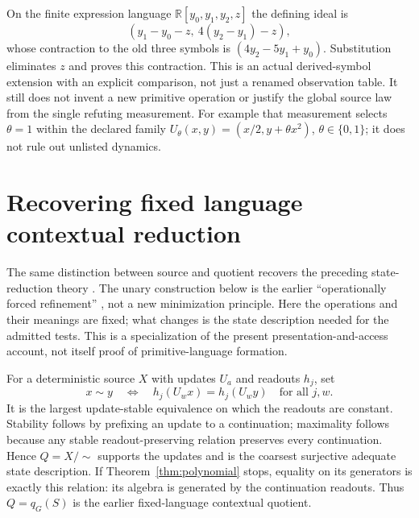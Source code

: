 \documentclass[11pt]{article}
\theoremstyle{definition}
\theoremstyle{remark}\newtheorem{remark}[theorem]{Remark}
\newcommand{\R}{\mathbb R}
\begin{document}
On the finite expression language $\R[y_0,y_1,y_2,z]$ the defining ideal is
\[
 (y_1-y_0-z,\ 4(y_2-y_1)-z),
\]
whose contraction to the old three symbols is
$(4y_2-5y_1+y_0)$. Substitution eliminates $z$ and proves this contraction.
This is an actual derived-symbol extension with an explicit comparison,
not just a renamed observation table. It still does not invent a new
primitive operation or justify the global source law from the single
refuting measurement. For example that measurement selects $\theta=1$
within the declared family $U_\theta(x,y)=(x/2,y+\theta x^2)$,
$\theta\in\{0,1\}$; it does not rule out unlisted dynamics.

\section{Recovering fixed language contextual reduction}
\label{sec:contextual}
The same distinction between source and quotient recovers the preceding
state-reduction theory \cite{learning-note,contextual-note}. The unary
construction below is the earlier ``operationally forced refinement''
\cite{learning-note}, not a new minimization principle. Here the operations and their meanings are fixed;
what changes is the state description needed for the admitted tests.
This is a specialization of the present presentation-and-access account,
not itself proof of primitive-language formation.

For a deterministic source $X$ with updates $U_a$ and readouts $h_j$, set
\[
 x\sim y\quad\Longleftrightarrow\quad
 h_j(U_wx)=h_j(U_wy)\quad\text{for all }j,w.
\]
It is the largest update-stable equivalence on which the readouts are
constant. Stability follows by prefixing an update to a continuation;
maximality follows because any stable readout-preserving relation preserves
every continuation. Hence $Q=X/{\sim}$ supports the updates and is the
coarsest surjective adequate state description. If
Theorem~\ref{thm:polynomial} stops, equality on its generators is exactly
this relation: its algebra is generated by the continuation readouts.
Thus $Q=q_G(S)$ is the earlier fixed-language contextual quotient.
\end{document}
